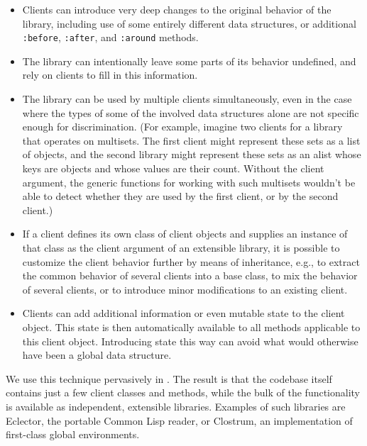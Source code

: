 \begin{itemize}
\item Clients can introduce very deep changes to the original behavior of
  the library, including use of some entirely different data structures, or
  additional \texttt{:before}, \texttt{:after}, and \texttt{:around}
  methods.
\item The library can intentionally leave some parts of its behavior
  undefined, and rely on clients to fill in this information.
\item The library can be used by multiple clients simultaneously, even in
  the case where the types of some of the involved data structures alone
  are not specific enough for discrimination.  (For example, imagine two
  clients for a library that operates on multisets.  The first client might
  represent these sets as a list of objects, and the second library might
  represent these sets as an alist whose keys are objects and whose values
  are their count.  Without the client argument, the generic functions for
  working with such multisets wouldn't be able to detect whether they are
  used by the first client, or by the second client.)
\item If a client defines its own class of client objects and supplies an
  instance of that class as the client argument of an extensible library,
  it is possible to customize the client behavior further by means of
  inheritance, e.g., to extract the common behavior of several clients into
  a base class, to mix the behavior of several clients, or to introduce
  minor modifications to an existing client.
\item Clients can add additional information or even mutable state to the
  client object.  This state is then automatically available to all methods
  applicable to this client object.  Introducing state this way can avoid
  what would otherwise have been a global data structure.
\end{itemize}

We use this technique pervasively in {\sysname}.  The result is that the
{\sysname} codebase itself contains just a few client classes and methods,
while the bulk of the functionality is available as independent, extensible
libraries.  Examples of such libraries are Eclector, the portable Common
Lisp reader, or Clostrum, an implementation of first-class global
environments.
